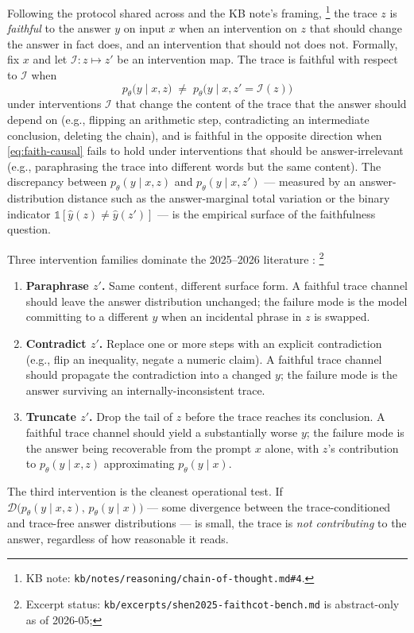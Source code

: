 Following the protocol shared across
\citet{arcuschin2025-cot-wild,shen2025-faithcot-bench,
mehta2026-faithfulness-scaling} and the KB note's framing,%
\footnote{KB note:
\nolinkurl{kb/notes/reasoning/chain-of-thought.md#4}.} the trace $z$ is
\emph{faithful} to the answer $y$ on input $x$ when an intervention on
$z$ that should change the answer in fact does, and an intervention
that should not does not. Formally, fix $x$ and let
$\mathcal{I}: z \mapsto z'$ be an intervention map. The trace is
faithful with respect to $\mathcal{I}$ when
\begin{equation}
  p_\theta\!\bigl(y \mid x, z\bigr) \;\neq\; p_\theta\!\bigl(y \mid x, z' = \mathcal{I}(z)\bigr)
  \label{eq:faith-causal}
\end{equation}
under interventions $\mathcal{I}$ that change the content of the trace
that the answer should depend on (e.g., flipping an arithmetic step, contradicting an
intermediate conclusion, deleting the chain), and is faithful in the
opposite direction when \cref{eq:faith-causal} fails to hold under
interventions that should be answer-irrelevant (e.g., paraphrasing the
trace into different words but the same content). The discrepancy
between $p_\theta(y \mid x, z)$ and $p_\theta(y \mid x, z')$ — measured
by an answer-distribution distance such as the answer-marginal total
variation or the binary indicator $\mathbb{1}[\hat y(z) \neq \hat y(z')]$
— is the empirical surface of the faithfulness question.

Three intervention families dominate the 2025--2026 literature
\citep[\S 3]{shen2025-faithcot-bench}:%
\footnote{Excerpt status:
\nolinkurl{kb/excerpts/shen2025-faithcot-bench.md} is abstract-only as of
2026-05; }
\begin{enumerate}
\item \textbf{Paraphrase $z'$.} Same content, different surface form. A
faithful trace channel should leave the answer distribution unchanged;
the failure mode is the model committing to a different $y$ when an
incidental phrase in $z$ is swapped.
\item \textbf{Contradict $z'$.} Replace one or more steps with an
explicit contradiction (e.g., flip an inequality, negate a numeric
claim). A faithful trace channel should propagate the contradiction
into a changed $y$; the failure mode is the answer surviving an
internally-inconsistent trace.
\item \textbf{Truncate $z'$.} Drop the tail of $z$ before the trace
reaches its conclusion. A faithful trace channel should yield a
substantially worse $y$; the failure mode is the answer being recoverable
from the prompt $x$ alone, with $z$'s contribution to $p_\theta(y \mid
x, z)$ approximating $p_\theta(y \mid x)$.
\end{enumerate}
The third intervention is the cleanest operational test. If
$\mathcal{D}\!\bigl(p_\theta(y \mid x, z),\, p_\theta(y \mid x)\bigr)$
— some divergence between the trace-conditioned and trace-free answer
distributions — is small, the trace is \emph{not contributing} to the
answer, regardless of how reasonable it reads.


